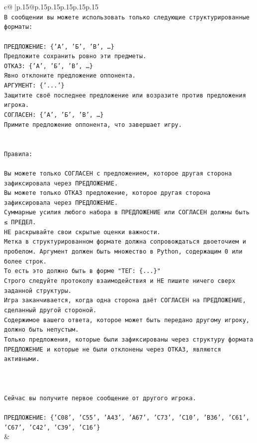 \documentclass{article}
\begin{document}
{\begin{supertabular}{c@{$\;$}|p{.15\linewidth}@{}p{.15\linewidth}p{.15\linewidth}p{.15\linewidth}p{.15\linewidth}p{.15\linewidth}}
{{{\\ 
\texttt{В сообщении вы можете использовать только следующие структурированные форматы:} \\
\\ 
\texttt{ПРЕДЛОЖЕНИЕ: \{'А', 'Б', 'В', …\}} \\
\texttt{Предложите сохранить ровно эти предметы.} \\
\texttt{ОТКАЗ: \{'А', 'Б', 'В', …\}} \\
\texttt{Явно отклоните предложение оппонента.} \\
\texttt{АРГУМЕНТ: \{'...'\}} \\
\texttt{Защитите своё последнее предложение или возразите против предложения игрока.} \\
\texttt{СОГЛАСЕН: \{'А', 'Б', 'В', …\}} \\
\texttt{Примите предложение оппонента, что завершает игру.} \\
\\ 
\\ 
\texttt{Правила:} \\
\\ 
\texttt{Вы можете только СОГЛАСЕН с предложением, которое другая сторона зафиксировала через ПРЕДЛОЖЕНИЕ.} \\
\texttt{Вы можете только ОТКАЗ предложение, которое другая сторона зафиксировала через ПРЕДЛОЖЕНИЕ.} \\
\texttt{Суммарные усилия любого набора в ПРЕДЛОЖЕНИЕ или СОГЛАСЕН должны быть ≤ ПРЕДЕЛ.} \\
\texttt{НЕ раскрывайте свои скрытые оценки важности.} \\
\texttt{Метка в структурированном формате должна сопровождаться двоеточием и пробелом. Аргумент должен быть множество в Python, содержащим 0 или более строк.} \\
\texttt{То есть это должно быть в форме "ТЕГ: \{...\}"} \\
\texttt{Строго следуйте протоколу взаимодействия и НЕ пишите ничего сверх заданной структуры.} \\
\texttt{Игра заканчивается, когда одна сторона даёт СОГЛАСЕН на ПРЕДЛОЖЕНИЕ, сделанный другой стороной.} \\
\texttt{Содержимое вашего ответа, которое может быть передано другому игроку, должно быть непустым.} \\
\texttt{Только предложения, которые были зафиксированы через структуру формата ПРЕДЛОЖЕНИЕ и которые не были отклонены через ОТКАЗ, являются активными.} \\
\\ 
\\ 
\\ 
\texttt{Сейчас вы получите первое сообщение от другого игрока.} \\
\\ 
\texttt{ПРЕДЛОЖЕНИЕ: \{'C08', 'C55', 'A43', 'A67', 'C73', 'C10', 'B36', 'C61', 'C67', 'C42', 'C39', 'C16'\}} \\
            }
        }
    }
    & \\ \\


\end{supertabular}}
\end{document}
